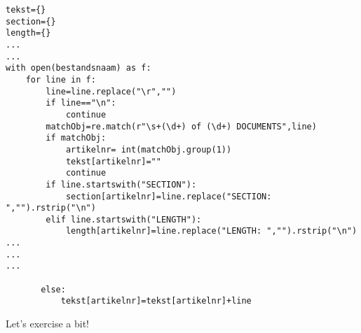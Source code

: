 \documentclass[compress]{beamer}
\begin{document}
{
	\begin{frame}[plain]
	\end{frame}
	\begin{frame}[plain]
	\end{frame}	
}
	
\begin{frame}
	\tiny
\begin{lstlisting}[basicstyle=\tiny]
tekst={}
section={}
length={}
...
...
with open(bestandsnaam) as f:
    for line in f:
        line=line.replace("\r","")
        if line=="\n":
            continue
        matchObj=re.match(r"\s+(\d+) of (\d+) DOCUMENTS",line)
        if matchObj:
            artikelnr= int(matchObj.group(1))
            tekst[artikelnr]=""
            continue
        if line.startswith("SECTION"):
            section[artikelnr]=line.replace("SECTION: ","").rstrip("\n")
        elif line.startswith("LENGTH"):
            length[artikelnr]=line.replace("LENGTH: ","").rstrip("\n")
...
...
...

       else:
           tekst[artikelnr]=tekst[artikelnr]+line
\end{lstlisting}

\end{frame}
	

\begin{frame}[standout]
Let's exercise a bit! 
\end{frame}




\begin{frame}[plain]
    \printbibliography
\end{frame}
\end{document}
